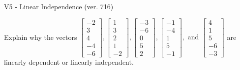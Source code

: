 \begin{exercise}
  \begin{exerciseTitle}V5 - Linear Independence (ver. 716)\end{exerciseTitle}
  \begin{exerciseStatement}
    Explain why the vectors \(\left[\begin{array}{r}
-2 \\
3 \\
4 \\
-4 \\
-6
\end{array}\right] , \left[\begin{array}{r}
1 \\
3 \\
2 \\
1 \\
-2
\end{array}\right] , \left[\begin{array}{r}
-3 \\
-6 \\
0 \\
5 \\
2
\end{array}\right] , \left[\begin{array}{r}
-1 \\
-4 \\
1 \\
5 \\
-1
\end{array}\right] , \text{ and } \left[\begin{array}{r}
4 \\
1 \\
5 \\
-6 \\
-3
\end{array}\right]\) are linearly dependent or linearly independent.	



\end{exerciseStatement}
\end{exercise}
